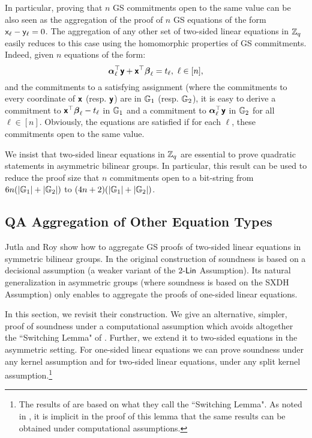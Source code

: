 In particular, proving that $n$ GS commitments open to the same value can be also seen as the aggregation of the proof  of $n$ GS equations of the form $\mathsf{x}_\ell -\mathsf{y}_\ell=0$. The aggregation of any other set of two-sided linear equations in $\mathbb{Z}_q$
easily reduces to this case using the homomorphic properties of GS commitments. Indeed, given $n$ equations of the form:
 $$  {\boldsymbol \alpha}_{\ell}^{\top} \textbf{\textsf{y}}+ \textbf{\textsf{x}}^{\top}\boldsymbol \beta_{\ell} =t_\ell, \ \ell \in [n],$$
 and the commitments to a satisfying assignment (where the commitments to every coordinate of $\textbf{\textsf{x}}$ (resp. $\textbf{\textsf{y}}$) are in $\mathbb{G}_1$ (resp. $\mathbb{G}_2$), it is easy to derive a commitment to $\textbf{\textsf{x}}^{\top} {\boldsymbol \beta}_{\ell}- t_{\ell}$ in $\mathbb{G}_1$ and a commitment to  ${\boldsymbol \alpha}_{\ell}^{\top} \textbf{\textsf{y}}$ in $\mathbb{G}_2$ for all $\ell \in [n]$. Obviously, the equations are satisfied if for each $\ell$, these commitments open to the same value. 

We insist that two-sided linear equations in $\mathbb{Z}_q$ are essential to prove quadratic statements in asymmetric bilinear groups. In particular, this result can be used to reduce the proof size that $n$ commitments open to a bit-string from $6n(|\mathbb{G}_1|+|\mathbb{G}_2|)$ to $(4n+2)(|\mathbb{G}_1|+|\mathbb{G}_2|)$.

\subsection{QA Aggregation of Other Equation Types} \label{sec:jutroyaggasym}
Jutla and Roy \cite{C:JutRoy14} show how to aggregate GS proofs of 
two-sided linear equations in symmetric bilinear groups. In the original construction of \cite{C:JutRoy14} soundness is based on a decisional assumption (a weaker variant of the $2\mbox{-}\mathsf{Lin}$ Assumption). Its natural generalization in asymmetric groups (where soundness is based on the SXDH Assumption) only enables to aggregate the proofs of one-sided linear equations. 

In this section, we revisit their construction. We give an alternative, simpler, proof of soundness under a computational assumption which avoids altogether the ``Switching Lemma" of \cite{C:JutRoy14}. Further, we extend it to two-sided equations in the asymmetric setting. For one-sided linear equations we can prove soundness under any kernel assumption and for two-sided linear equations, under any split kernel assumption.\footnote{The results of  \cite{C:JutRoy14} are based on what they call  the ``Switching Lemma". As noted in \cite{EPRINT:MorRafVil15}, it is implicit in the proof of this lemma that the same results can be obtained under computational assumptions.}

